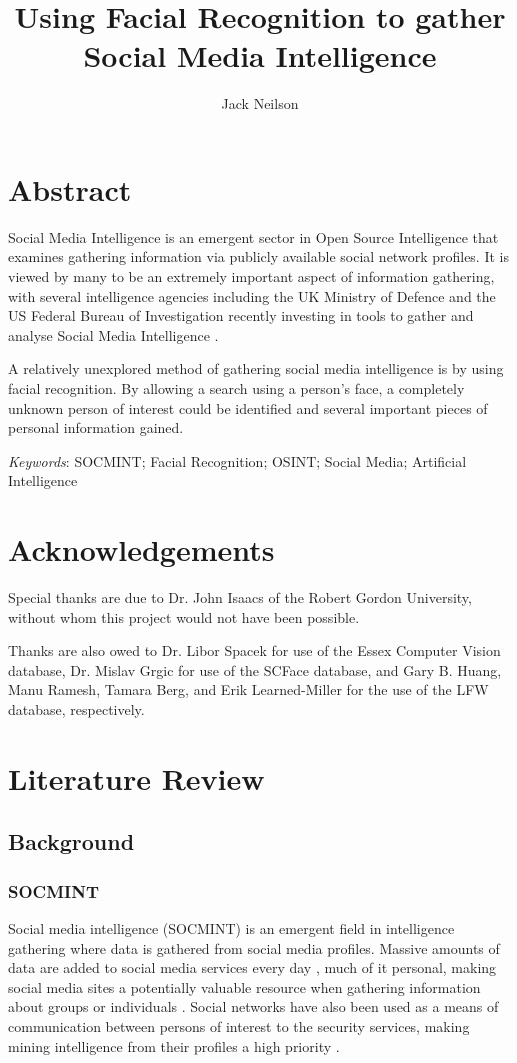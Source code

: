 \documentclass[12pt]{article}
\begin{document}
\title{Using Facial Recognition to gather Social Media Intelligence}
\author{Jack Neilson}
\maketitle
\newpage
\tableofcontents
\newpage

\section{Abstract}
Social Media Intelligence is an emergent sector in Open Source Intelligence that examines gathering information via publicly available social network profiles. It is viewed by many to be an extremely important aspect of information gathering, with several intelligence agencies including the UK Ministry of Defence and the US Federal Bureau of Investigation recently investing in tools to gather and analyse Social Media Intelligence \citep{socmintpublicsafety}.

A relatively unexplored method of gathering social media intelligence is by using facial recognition. By allowing a search using a person's face, a completely unknown person of interest could be identified and several important pieces of personal information gained.

\textit{Keywords}: SOCMINT; Facial Recognition; OSINT; Social Media; Artificial Intelligence

\section{Acknowledgements}
Special thanks are due to Dr. John Isaacs of the Robert Gordon University, without whom this project would not have been possible.

Thanks are also owed to Dr. Libor Spacek for use of the Essex Computer Vision database, Dr. Mislav Grgic for use of the SCFace database, and Gary B. Huang, Manu Ramesh, Tamara Berg, and Erik Learned-Miller for the use of the LFW database, respectively.

\newpage
\section{Literature Review}
\subsection{Background}
\subsubsection{SOCMINT}
Social media intelligence (SOCMINT) is an emergent field in intelligence gathering where data is gathered from social media profiles. Massive amounts of data are added to social media services every day \citep{socmintoverview}, much of it personal, making social media sites a potentially valuable resource when gathering information about groups or individuals \citep{gchqmasssurveillance}. Social networks have also been used as a means of communication between persons of interest to the security services, making mining intelligence from their profiles a high priority \citep{socmintoverview}\citep{policesocmint}.
\end{document}
